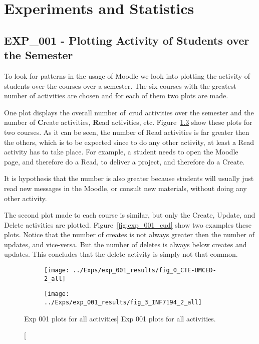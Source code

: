 \chapter{Experiments and Statistics}

\section{EXP\_001 - Plotting Activity of Students over the Semester}

To look for patterns in the usage of Moodle we look into plotting the activity
of students over the courses over a semester. The six courses with the greatest
number of activities are chosen and for each of them two plots are made.

One plot displays the overall number of~\gls{crud} activities over the semester
and the number of \textbf{C}reate activities, \textbf{R}ead activities, etc.
Figure~\ref{fig:exp_001_all} show these plots for two courses. As it can be
seen, the number of Read activities is far greater then the others, which is to
be expected since to do any other activity, at least a Read activity has to
take place. For example, a student needs to open the Moodle page, and therefore
do a Read, to deliver a project, and therefore do a Create.

It is hypothesis that the number is also greater because students will usually
just read new messages in the Moodle, or consult new materials, without doing
any other activity.

The second plot made to each course is similar, but only the Create, Update,
and Delete activities are plotted. Figure~\ref{fig:exp_001_cud} show two
examples these plots. Notice that the number of creates is not always greater
then the number of updates, and vice-versa. But the number of deletes is always
below creates and updates. This concludes that the delete activity is simply
not that common.

\begin{figure}[h!]
    \centering

    \begin{subfigure}{.5\textwidth}
        \centering
        \texttt{[image: ../Exps/exp\_001\_results/fig\_0\_CTE-UMCED-2\_all]}
        \label{subfig:exp_001_0_all}
    \end{subfigure}%
    \begin{subfigure}{.5\textwidth}
        \centering
        \texttt{[image: ../Exps/exp\_001\_results/fig\_3\_INF7194\_2\_all]}
        \label{subfig:exp_001_3_all}
    \end{subfigure}

    \caption
        [Exp 001 plots for all activities]
        {Exp 001 plots for all activities.}

    \label{fig:exp_001_all}
\end{figure}


